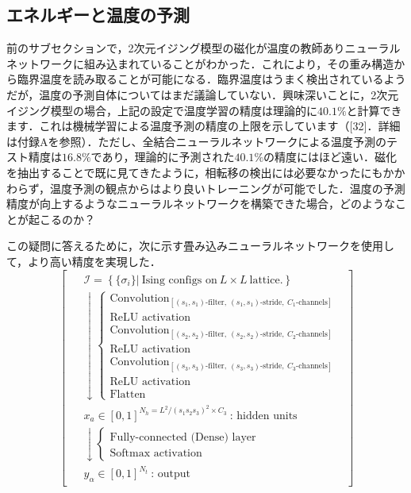 \documentclass[a4paper,11pt]{jsarticle}
\begin{document}
\subsection{エネルギーと温度の予測}
前のサブセクションで，2次元イジング模型の磁化が温度の教師ありニューラルネットワークに組み込まれていることがわかった．これにより，その重み構造から臨界温度を読み取ることが可能になる．臨界温度はうまく検出されているようだが，温度の予測自体についてはまだ議論していない．興味深いことに，2次元イジング模型の場合，上記の設定で温度学習の精度は理論的に$40.1\%$と計算できます．これは機械学習による温度予測の精度の上限を示しています（[32]．詳細は付録Aを参照）．ただし、全結合ニューラルネットワークによる温度予測のテスト精度は$16.8\%$であり，理論的に予測された$40.1\%$の精度にはほど遠い．磁化を抽出することで既に見てきたように，相転移の検出には必要なかったにもかかわらず，温度予測の観点からはより良いトレーニングが可能でした．温度の予測精度が向上するようなニューラルネットワークを構築できた場合，どのようなことが起こるのか？\par
この疑問に答えるために，次に示す畳み込みニューラルネットワークを使用して，より高い精度を実現した．
\begin{equation}
  \begin{bmatrix}
    \begin{aligned}
       & \mathcal{I} = \left\{ \{ \sigma_i \} \Big| \ \text{Ising configs on} \ L \times L \ \text{lattice.} \right\}        \\
       & \downarrow
      \begin{cases}
        \text{Convolution}_{[(s_1,s_1)\text{-filter}, \ (s_1,s_1)\text{-stride}, \ C_1\text{-channels}]} \\
        \text{ReLU activation}                                                                           \\
        \text{Convolution}_{[(s_2,s_2)\text{-filter}, \ (s_2,s_2)\text{-stride}, \ C_2\text{-channels}]} \\
        \text{ReLU activation}                                                                           \\
        \text{Convolution}_{[(s_3,s_3)\text{-filter}, \ (s_3,s_3)\text{-stride}, \ C_3\text{-channels}]} \\
        \text{ReLU activation}                                                                           \\
        \text{Flatten}
      \end{cases} \\
       & x_a \in [0,1]^{N_h = L^2/(s_1s_2s_3)^2 \times C_3} \ \text{: hidden units}                                          \\
       & \downarrow
      \begin{cases}
        \text{Fully-connected (Dense) layer} \\
        \text{Softmax activation}
      \end{cases}                                                                                   \\
       & y_{\alpha} \in [0,1]^{N_t} \ \text{: output}
    \end{aligned}
  \end{bmatrix}
\end{equation}
\end{document}

